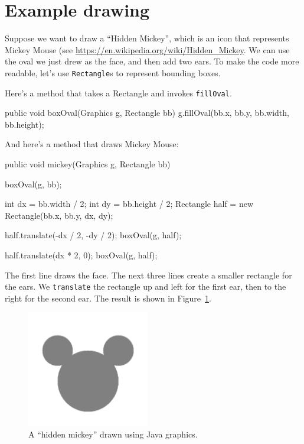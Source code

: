 \documentclass[12pt]{book}
\theoremstyle{exercise}
\newcommand{\java}[1]{\verb"#1"}
\begin{document}
\section{Example drawing}


Suppose we want to draw a ``Hidden Mickey'', which is an icon that represents Mickey Mouse (see \url{https://en.wikipedia.org/wiki/Hidden_Mickey}.
We can use the oval we just drew as the face, and then add two ears.
To make the code more readable, let's use \java{Rectangle}s to represent bounding boxes.

Here's a method that takes a Rectangle and invokes \java{fillOval}.

\begin{code}
    public void boxOval(Graphics g, Rectangle bb) {
        g.fillOval(bb.x, bb.y, bb.width, bb.height);
    }
\end{code}

And here's a method that draws Mickey Mouse:

\begin{code}
    public void mickey(Graphics g, Rectangle bb) {
        boxOval(g, bb);

        int dx = bb.width / 2;
        int dy = bb.height / 2;
        Rectangle half = new Rectangle(bb.x, bb.y, dx, dy);

        half.translate(-dx / 2, -dy / 2);
        boxOval(g, half);

        half.translate(dx * 2, 0);
        boxOval(g, half);
    }
\end{code}

The first line draws the face.
The next three lines create a smaller rectangle for the ears.
We \java{translate} the rectangle up and left for the first ear, then to the right for the second ear.
The result is shown in Figure~\ref{fig.mickey}.

\begin{figure}
\begin{center}
\includegraphics[height=2in]{figs/mickey.pdf}
\caption{A ``hidden mickey'' drawn using Java graphics.}
\label{fig.mickey}
\end{center}
\end{figure}
\end{document}
